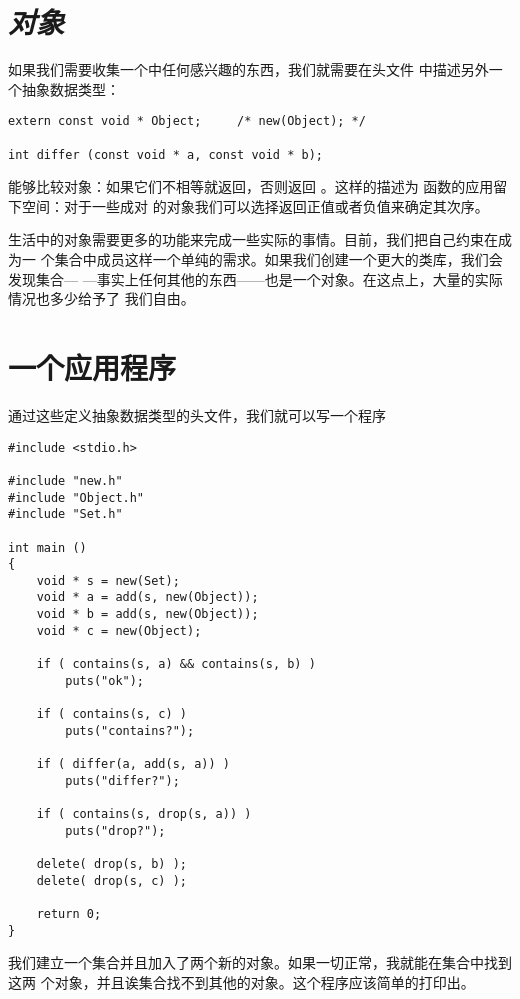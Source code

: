 \section{\emph{对象}}
如果我们需要收集一个中任何感兴趣的东西，我们就需要在头文件
 中描述另外一个抽象数据类型：
\begin{lstlisting}
extern const void * Object;		/* new(Object); */

int differ (const void * a, const void * b);
\end{lstlisting}
 能够比较对象：如果它们不相等就返回，否则返回
。这样的描述为 函数的应用留下空间：对于一些成对
的对象我们可以选择返回正值或者负值来确定其次序。

生活中的对象需要更多的功能来完成一些实际的事情。目前，我们把自己约束在成为一
个集合中成员这样一个单纯的需求。如果我们创建一个更大的类库，我们会发现集合—
—事实上任何其他的东西——也是一个对象。在这点上，大量的实际情况也多少给予了
我们自由。

\section{一个应用程序}
通过这些定义抽象数据类型的头文件，我们就可以写一个程序
\begin{lstlisting}
#include <stdio.h>

#include "new.h"
#include "Object.h"
#include "Set.h"

int main ()
{
	void * s = new(Set);
	void * a = add(s, new(Object));
	void * b = add(s, new(Object));
	void * c = new(Object);

	if ( contains(s, a) && contains(s, b) )
		puts("ok");

	if ( contains(s, c) )
		puts("contains?");

	if ( differ(a, add(s, a)) )
		puts("differ?");

	if ( contains(s, drop(s, a)) )
		puts("drop?");

	delete( drop(s, b) );
	delete( drop(s, c) );

	return 0;
}
\end{lstlisting}
我们建立一个集合并且加入了两个新的对象。如果一切正常，我就能在集合中找到这两
个对象，并且诶集合找不到其他的对象。这个程序应该简单的打印出。

